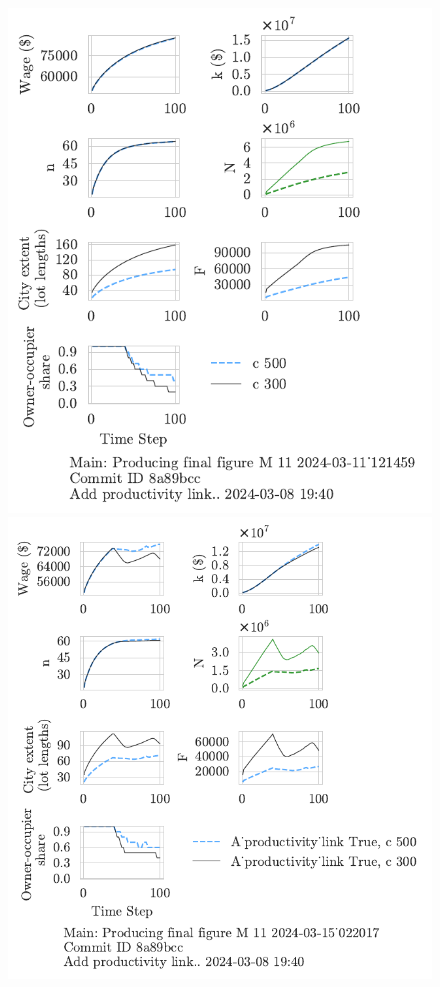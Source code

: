{\begin{figure}[h!tb] 
    \centering
    \includegraphics[scale=.75, trim={0 1.4cm 1.5cm 0},clip]{fig/c-Main-121459.pdf} 
    \includegraphics[scale=.75, trim={0 1.4cm 2.3cm 0},clip]{fig/With-productivity_link-c-15_022017.pdf} 

\end{figure}}
